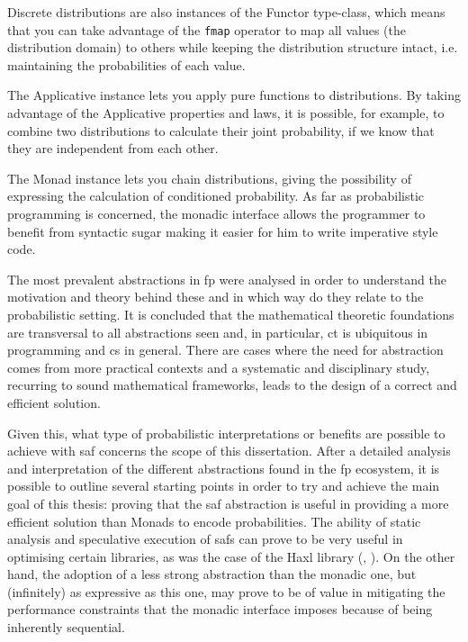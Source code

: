 \documentclass[
  oneside,
  11pt, a4paper,
  footinclude=true,
  headinclude=true,
  cleardoublepage=empty
]{scrbook}
\theoremstyle{definition}
\theoremstyle{definition}
\begin{document}
    Discrete distributions are also instances of the Functor type-class, which means that you can take advantage of the \texttt{fmap} operator to map all values (the distribution domain) to others while keeping the distribution structure intact, i.e. maintaining the probabilities of each value.
        
    The Applicative instance lets you apply pure functions to distributions. By taking advantage of the Applicative properties and laws, it is possible, for example, to combine two distributions to calculate their joint probability, if we know that they are independent from each other.
        
    The Monad instance lets you chain distributions, giving the possibility of expressing the calculation of conditioned probability. As far as probabilistic programming is concerned, the monadic interface allows the programmer to benefit from syntactic sugar making it easier for him to write imperative style code.
    
    The most prevalent abstractions in \gls{fp} were analysed in order to understand the motivation and theory behind these and in which way do they relate to the probabilistic setting. It is concluded that the mathematical theoretic foundations are transversal to all abstractions seen and, in particular, \gls{ct} is ubiquitous in programming and \gls{cs} in general. There are cases where the need for abstraction comes from more practical contexts and a systematic and disciplinary study, recurring to sound mathematical frameworks, leads to the design of a correct and efficient solution.
    
    Given this, what type of probabilistic interpretations or benefits are possible to achieve with \gls{saf} concerns the scope of this dissertation. After a detailed analysis and interpretation of the different abstractions found in the \gls{fp} ecosystem, it is possible to outline several starting points in order to try and achieve the main goal of this thesis: proving that the \gls{saf} abstraction is useful in providing a more efficient solution than Monads to encode probabilities. The ability of static analysis and speculative execution of \gls{saf}s can prove to be very useful in optimising certain libraries, as was the case of the Haxl library (\cite{Marlow:2014:NFA:2692915.2628144}, \cite{andrey2019selective}). On the other hand, the adoption of a less strong abstraction than the monadic one, but (infinitely) as expressive as this one, may prove to be of value in mitigating the performance constraints that the monadic interface imposes because of being inherently sequential.
    
\end{document}
